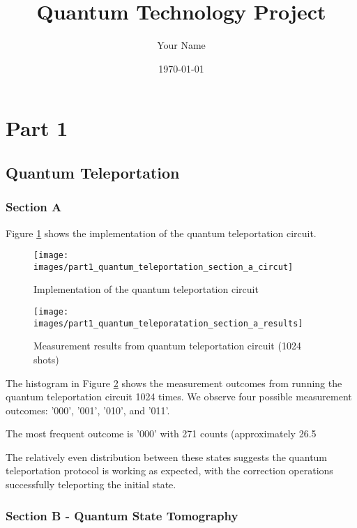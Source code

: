 \documentclass[12pt,a4paper]{article}
\title{Quantum Technology Project}
\author{Your Name}
\date{\today}
\begin{document}
\maketitle

\section{Part 1}

\subsection{Quantum Teleportation}

\subsubsection{Section A}
Figure \ref{fig:teleportation_circuit} shows the implementation of the quantum teleportation circuit.

\begin{figure}[h]
\centering
\texttt{[image: images/part1\_quantum\_teleportation\_section\_a\_circut]}
\caption{Implementation of the quantum teleportation circuit}
\label{fig:teleportation_circuit}
\end{figure}

\begin{figure}[h]
\centering
\texttt{[image: images/part1\_quantum\_teleporatation\_section\_a\_results]}
\caption{Measurement results from quantum teleportation circuit (1024 shots)}
\label{fig:teleportation_results}
\end{figure}

The histogram in Figure \ref{fig:teleportation_results} shows the measurement outcomes from running the quantum teleportation circuit 1024 times. We observe four possible measurement outcomes: '000', '001', '010', and '011'.

The most frequent outcome is '000' with 271 counts (approximately 26.5%

The relatively even distribution between these states suggests the quantum teleportation protocol is working as expected, with the correction operations successfully teleporting the initial state.


\subsubsection{Section B - Quantum State Tomography}
\end{document}
